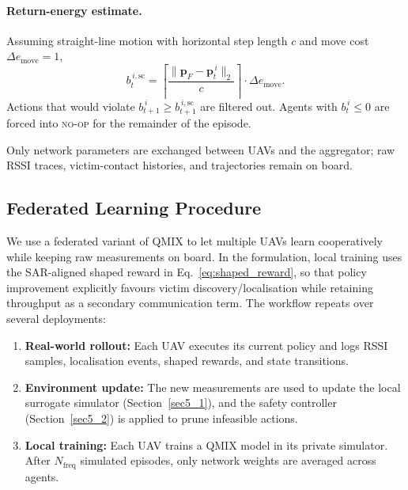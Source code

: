 \documentclass[drones,article,accept,pdftex,moreauthors]{Definitions/mdpi}
\begin{document}
\paragraph{Return-energy estimate.}
Assuming straight-line motion with horizontal step length $c$ and move cost
$\Delta e_{\text{move}}=1$,
\begin{equation}
b_{t}^{\,i,\mathrm{sc}}
=
\left\lceil
\frac{\big\|\mathbf{p}_F - \mathbf{p}_t^{\,i}\big\|_2}{c}
\right\rceil
\cdot \Delta e_{\text{move}}.
\label{eq:bsc}
\end{equation}
Actions that would violate $b_{t+1}^{\,i} \ge b_{t+1}^{\,i,\mathrm{sc}}$ are filtered
out. Agents with $b_t^{\,i}\le 0$ are forced into \textsc{no-op} for the remainder of
the episode.

Only network parameters are exchanged between UAVs and the aggregator; raw RSSI traces,
victim-contact histories, and trajectories remain on board.

\subsection{Federated Learning Procedure}\label{sec5_3}

We use a federated variant of QMIX to let multiple UAVs learn cooperatively while
keeping raw measurements on board. In the formulation, local training uses the
SAR-aligned shaped reward in Eq.~\eqref{eq:shaped_reward}, so that policy improvement
explicitly favours victim discovery/localisation while retaining throughput as a
secondary communication term. The workflow repeats over several deployments:

\begin{enumerate}[label=(\roman*)]
    \item \textbf{Real-world rollout:}
    Each UAV executes its current policy and logs RSSI samples, localisation events,
    shaped rewards, and state transitions.

    \item \textbf{Environment update:}
    The new measurements are used to update the local surrogate simulator
    (Section~\ref{sec5_1}), and the safety controller (Section~\ref{sec5_2})
    is applied to prune infeasible actions.

    \item \textbf{Local training:}
    Each UAV trains a QMIX model in its private simulator. After
    $N_{\text{freq}}$ simulated episodes, only network weights are averaged
    across agents.
\end{enumerate}
\end{document}

